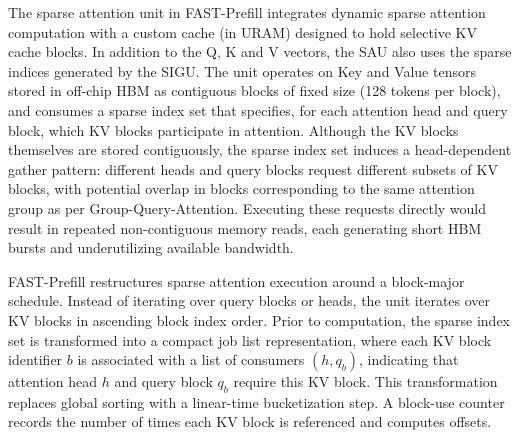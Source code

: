 \documentclass[conference]{IEEEtran}
\begin{document}
The sparse attention unit in FAST-Prefill integrates dynamic sparse attention computation with a custom cache (in URAM) designed to hold selective KV cache blocks. In addition to the Q, K and V vectors, the SAU also uses the sparse indices generated by the SIGU. 
The unit operates on Key and Value tensors stored in off-chip HBM as contiguous blocks of fixed size (128 tokens per block), and consumes a sparse index set that specifies, for each attention head and query block, which KV blocks participate in attention. Although the KV blocks themselves are stored contiguously, the sparse index set induces a head-dependent gather pattern: different heads and query blocks request different subsets of KV blocks, with potential overlap in blocks corresponding to the same attention group as per Group-Query-Attention. Executing these requests directly would result in repeated non-contiguous memory reads, each generating short HBM bursts and underutilizing available bandwidth. 

FAST-Prefill restructures sparse attention execution around a block-major schedule. Instead of iterating over query blocks or heads, the unit iterates over KV blocks in ascending block index order. Prior to computation, the sparse index set is transformed into a compact job list representation, where each KV block identifier $b$ is associated with a list of consumers $(h,q_b)$, indicating that attention head $h$ and query block $q_b$ require this KV block. This transformation replaces global sorting with a linear-time bucketization step. A block-use counter records the number of times each KV block is referenced and computes offsets. 
\end{document}
